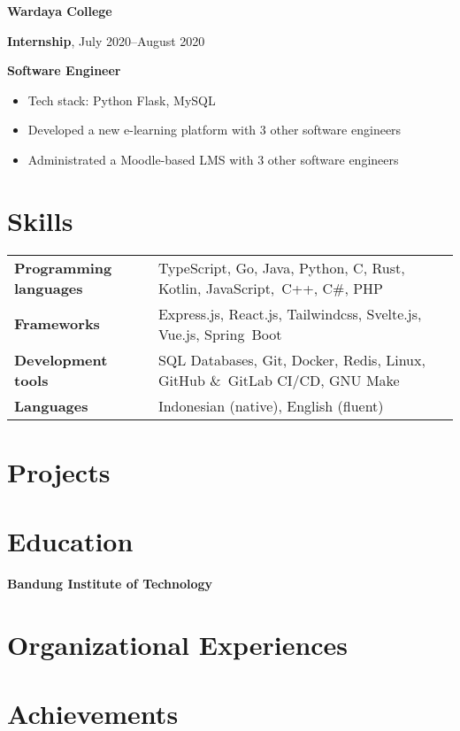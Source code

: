 \documentclass[10pt]{article}
\newcommand{\workExpVspace}{0.2em}
\newcommand{\workExp}[6]{
    \noindent \textbf{#1}

    \textbf{#2}, #3--#4

    \textbf{#5}

    {#6}
    \vspace{\workExpVspace}
}
\begin{document}
\workExp
    {Wardaya College}
    {Internship}
    {July 2020}
    {August 2020}
    {Software Engineer}
    {
        \begin{itemize}
            \item Tech stack: Python Flask, MySQL
            \item Developed a new e-learning platform with 3 other software engineers
            \item Administrated a Moodle-based LMS with 3 other software engineers
        \end{itemize}
    }

\section{Skills}

\begin{tabularx}{\textwidth}{@{}X l}
\textbf{Programming languages} & TypeScript, Go, Java, Python, C, Rust, Kotlin, JavaScript,\
                                 C++, C\#, PHP \\
\textbf{Frameworks}            & Express.js, React.js, Tailwindcss, Svelte.js, Vue.js, Spring\
                                 Boot \\
\textbf{Development tools}     & SQL Databases, Git, Docker, Redis, Linux, GitHub \&\
                                 GitLab CI/CD, GNU Make \\
\textbf{Languages}             & Indonesian (native), English (fluent)
\end{tabularx}

\vspace{-0.5em}

\section{Projects}

\section{Education}
\textbf{Bandung Institute of Technology}

\section{Organizational Experiences}

\section{Achievements}
\end{document}
